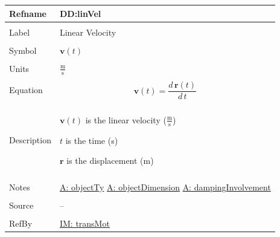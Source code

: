 \documentclass[12pt]{article}
\begin{document}
\noindent \begin{minipage}{\textwidth}
\begin{tabular}{p{} p{}}
\toprule \textbf{Refname} & \textbf{DD:linVel}
\label{DD:linVel}
\\ \midrule \\
Label & Linear Velocity
\\ \midrule \\
Symbol & $\mathbf{v}(t)$
\\ \midrule \\
Units & $\frac{\text{m}}{\text{s}}$
\\ \midrule \\
Equation & \begin{displaymath}
           \mathbf{v}(t)=\frac{d\,\mathbf{r}\left(t\right)}{d\,t}
           \end{displaymath}
\\ \midrule \\
Description & \begin{symbDescription}
              \item{$\mathbf{v}(t)$ is the linear velocity ($\frac{\text{m}}{\text{s}}$)}
              \item{$t$ is the time (s)}
              \item{$\mathbf{r}$ is the displacement (m)}
              \end{symbDescription}
\\ \midrule \\
Notes & \hyperref[assumpOT]{A: objectTy}
        \hyperref[assumpOD]{A: objectDimension}
        \hyperref[assumpDI]{A: dampingInvolvement}
\\ \midrule \\
Source & --
\\ \midrule \\
RefBy & \hyperref[IM:transMot]{IM: transMot}
\\ \bottomrule \end{tabular}
\end{minipage}
\par~
\end{document}
